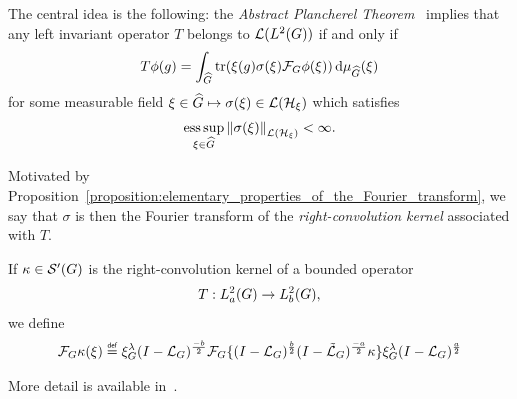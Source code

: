 The central idea is the following:
the \emph{Abstract Plancherel Theorem}~\cite[Subsection 1.8.2]{FischerRuzhansky16} implies that
any left invariant operator $T$ belongs to $\Lin {\Lebesgue 2 \Group}$ if and only if
\begin{align*}
    T \phi(g) = \int_{\dualGroup \Group} \tr(\xi(g) \sigma(\xi) \Fourier \phi(\xi)) \dd \Plancherel {\Group}(\xi)
\end{align*}
for some measurable field $\xi \in \dualGroup \Group \mapsto \sigma(\xi) \in \Lin {\mathcal H_\xi}$
which satisfies
\begin{align*}
    \esssup_{\xi \in \dualGroup \Group} \norm [\Lin {\mathcal H_\xi}] {\sigma(\xi)} < \infty.
\end{align*}

Motivated by Proposition~\ref{proposition:elementary_properties_of_the_Fourier_transform},
we say that $\sigma$ is then the Fourier transform of the \emph{right-convolution kernel} associated with $T$.

If $\kappa \in \TemperedDistributions \Group$ is the right-convolution kernel of a bounded operator
\begin{align*}
    T : \Sobolev a \to \Sobolev b,
\end{align*}
we define
\begin{align*}
    \Fourier \kappa(\xi) \defeq
    \Rep \lambda \BesselPotential {-b}
    \Fourier \{ \BesselPotential b \BesselPotentialRight {-a} \kappa \}
    \Rep \lambda \BesselPotential a
\end{align*}

More detail is available in~\cite{FischerRuzhansky16}.

